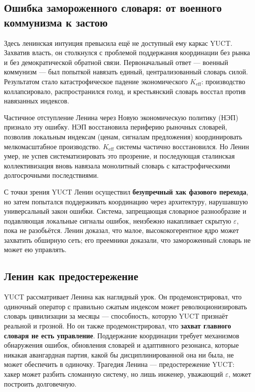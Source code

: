 \documentclass[12pt,a4paper]{article}
\begin{document}
	\subsection{Ошибка замороженного словаря: от военного коммунизма к застою}
	
	Здесь ленинская интуиция превысила ещё не доступный ему каркас YUCT. Захватив власть, он столкнулся с проблемой поддержания координации без рынка и без демократической обратной связи. Первоначальный ответ — военный коммунизм — был попыткой навязать единый, централизованный словарь силой. Результатом стало катастрофическое падение экономического \(K_{\mathrm{eff}}\): производство коллапсировало, распространился голод, и крестьянский словарь восстал против навязанных индексов.
	
	Частичное отступление Ленина через Новую экономическую политику (НЭП) признало эту ошибку. НЭП восстановила периферию рыночных словарей, позволив локальным индексам (ценам, сигналам предложения) координировать мелкомасштабное производство. \(K_{\mathrm{eff}}\) системы частично восстановился. Но Ленин умер, не успев систематизировать это прозрение, и последующая сталинская коллективизация вновь навязала монолитный словарь с катастрофическими долгосрочными последствиями.
	
	С точки зрения YUCT Ленин осуществил \textbf{безупречный хак фазового перехода}, но затем попытался поддерживать координацию через архитектуру, нарушавшую универсальный закон ошибки. Система, запрещающая словарное разнообразие и подавляющая локальные сигналы ошибок, неизбежно накапливает скрытую \(\varepsilon\), пока не разобьётся. Ленин доказал, что малое, высококогерентное ядро может захватить обширную сеть; его преемники доказали, что замороженный словарь не может ею управлять.
	
	\subsection{Ленин как предостережение}
	
	YUCT рассматривает Ленина как наглядный урок. Он продемонстрировал, что одиночный оператор с правильно сжатым индексом может революционизировать словарь цивилизации за месяцы — способность, которую YUCT признаёт реальной и грозной. Но он также продемонстрировал, что \textbf{захват главного словаря не есть управление}. Поддержание координации требует механизмов обнаружения ошибок, обновления словарей и адаптивного резонанса, которые никакая авангардная партия, какой бы дисциплинированной она ни была, не может обеспечить в одиночку. Трагедия Ленина — предостережение YUCT: хакер может разбить сломанную систему, но лишь инженер, уважающий \(\varepsilon\), может построить долговечную.
	
\end{document}
